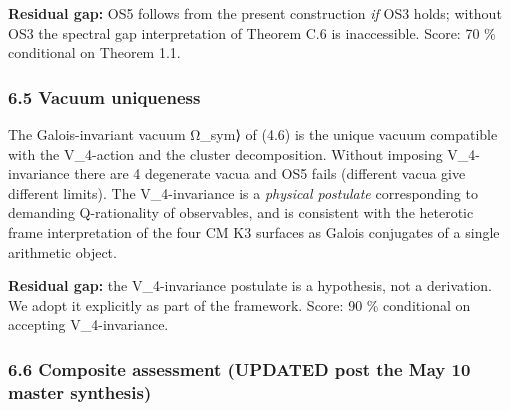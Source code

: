 \documentclass[
 11pt,
 a4paper,
]{article}
\begin{document}
\textbf{Residual gap:} OS5 follows from the present construction \emph{if} OS3 holds; without OS3 the spectral gap interpretation of Theorem C.6 is inaccessible. Score: 70 \% conditional on Theorem 1.1.

\hypertarget{vacuum-uniqueness}{%
\subsubsection{6.5 Vacuum uniqueness}\label{vacuum-uniqueness}}

The Galois-invariant vacuum \textbar Ω\_sym⟩ of (4.6) is the unique vacuum compatible with the V\_4-action and the cluster decomposition. Without imposing V\_4-invariance there are 4 degenerate vacua and OS5 fails (different vacua give different limits). The V\_4-invariance is a \emph{physical postulate} corresponding to demanding Q-rationality of observables, and is consistent with the heterotic frame interpretation of the four CM K3 surfaces as Galois conjugates of a single arithmetic object.

\textbf{Residual gap:} the V\_4-invariance postulate is a hypothesis, not a derivation. We adopt it explicitly as part of the framework. Score: 90 \% conditional on accepting V\_4-invariance.

\hypertarget{composite-assessment-updated-post-the May 10 master synthesis}{%
\subsubsection{6.6 Composite assessment (UPDATED post the May 10 master synthesis)}\label{composite-assessment-updated-post-the May 10 master synthesis}}
\end{document}
